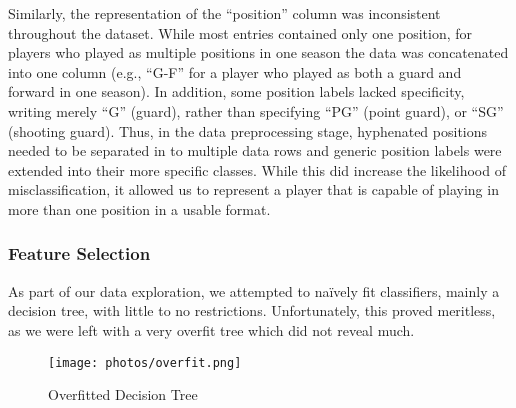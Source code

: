 \documentclass[./main.tex]{subfiles}
\begin{document}
Similarly, the representation of the ``position'' column was inconsistent throughout the dataset. While most entries contained only one position, for players who played as multiple positions in one season the data was concatenated into one column (e.g., ``G-F'' for a player who played as both a guard and forward in one season). In addition, some position labels lacked specificity, writing merely ``G'' (guard), rather than specifying ``PG'' (point guard), or ``SG'' (shooting guard). Thus, in the data preprocessing stage, hyphenated positions needed to be separated in to multiple data rows and generic position labels were extended into their more specific classes. While this did increase the likelihood of misclassification, it allowed us to represent a player that is capable of playing in more than one position in a usable format.

\subsubsection{Feature Selection}
As part of our data exploration, we attempted to na\"ively fit classifiers, mainly a decision tree, with little to no restrictions. Unfortunately, this proved meritless, as we were left with a very overfit tree which did not reveal much.
\begin{figure}[H]
        \centering
        \texttt{[image: photos/overfit.png]}
        \caption{Overfitted Decision Tree}
    \label{fig:overfit-tree}
\end{figure}
\end{document}
